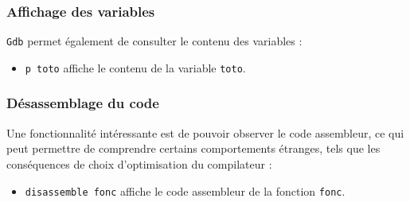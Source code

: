 %
\subsubsection{Affichage des variables}

   {\tt Gdb} permet également de consulter le contenu des variables :

\begin{itemize}
   \item {\tt p toto} affiche le contenu de la variable {\tt toto}.
\end{itemize}

%
\subsubsection{Désassemblage du code}

    Une fonctionnalité intéressante est de pouvoir observer le code
assembleur, ce qui peut permettre de comprendre certains comportements
étranges, tels que les conséquences de choix d'optimisation du
compilateur :

\begin{itemize}
   \item {\tt disassemble fonc} affiche le code assembleur de la
     fonction {\tt fonc}.
\end{itemize}

